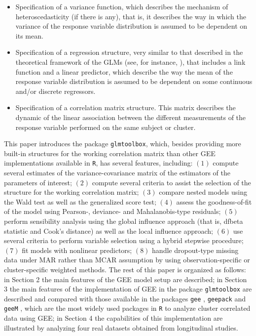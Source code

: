 \begin{itemize}
\item Specification of a variance function, which describes the mechanism of heteroscedasticity (if there is any), that is, it describes the way in which the variance of the response variable distribution is assumed to be dependent on its mean.
\item Specification of a regression structure, very similar to that described in the theoretical framework of the GLMs (see, for instance, \cite{MN89}), that includes a link function and a linear predictor, which describe the way the mean of the response variable distribution is assumed to be dependent on some continuous and/or discrete regressors.
\item Specification of a correlation matrix structure. This matrix describes the dynamic of the linear association between the different measurements of the response variable performed on the same subject or cluster.
\end{itemize}

This paper introduces the package {\tt glmtoolbox}, which, besides providing more built-in structures for the working correlation matrix than other GEE implementations available in {\tt R}, has several features, including: $(1)$ compute several estimates of the variance-covariance matrix of the estimators of the parameters of interest; $(2)$ compute several criteria to assist the selection of the structure for the working correlation matrix; $(3)$ compare nested models using the Wald test as well as the generalized score test; $(4)$ assess the goodness-of-fit of the model using Pearson-, deviance- and Mahalanobis-type residuals; $(5)$ perform sensibility analysis using the global influence approach (that is, dfbeta statistic and Cook's distance) as well as the local influence approach; $(6)$ use several criteria to perform variable selection using a hybrid stepwise procedure; $(7)$ fit models with nonlinear predictors; $(8)$ handle dropout-type missing data under MAR rather than MCAR assumption by using observation-specific or cluster-specific weighted methods. The rest of this paper is organized as follows: in Section 2 the main features of the GEE model setup are described; in Section 3 the main features of the implementation of GEE in the package {\tt glmtoolbox} are described and compared with those available in the packages {\tt gee} \citep{C22}, {\tt geepack} \citep{Yan02,HHY05} and {\tt geeM} \citep{MNHR13}, which are the most widely used packages in {\tt R} to analyze cluster correlated data using GEE; in Section 4 the capabilities of this implementation are illustrated by analyzing four real datasets obtained from longitudinal studies.


